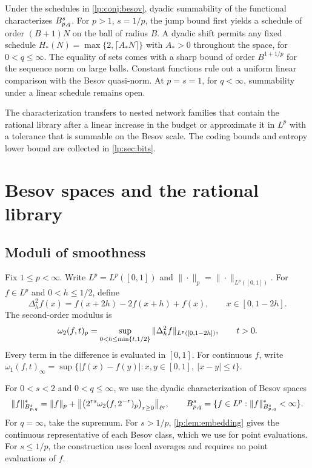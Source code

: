 \documentclass[11pt,a4paper]{article}
\begin{document}
Under the schedules in \cref{lp:conj:besov}, dyadic summability of the functional characterizes $B^{s}_{p,q}$. For $p>1$, $s=1/p$, the jump bound first yields a schedule of order $(B+1)N$ on the ball of radius $B$. A dyadic shift permits any fixed schedule $H_*(N)=\max\{2,\lceil A_*N\rceil\}$ with $A_*>0$ throughout the space, for $0<q\le\infty$. The equality of sets comes with a sharp bound of order $B^{1+1/p}$ for the sequence norm on large balls. Constant functions rule out a uniform linear comparison with the Besov quasi-norm. At $p=s=1$, for $q<\infty$, summability under a linear schedule remains open.

The characterization transfers to nested network families that contain the rational library after a linear increase in the budget or approximate it in $L^p$ with a tolerance that is summable on the Besov scale. The coding bounds and entropy lower bound are collected in \cref{lp:sec:bits}.

\section{Besov spaces and the rational library}
\label{lp:sec:defs}

\subsection{Moduli of smoothness}

Fix $1\le p<\infty$. Write $L^p=L^p([0,1])$ and $\|\cdot\|_p=\|\cdot\|_{L^p([0,1])}$. For $f\in L^p$ and $0<h\le1/2$, define
\begin{equation}
 \Delta_h^2f(x)=f(x+2h)-2f(x+h)+f(x),\qquad x\in[0,1-2h].
 \label{lp:eq:second-difference}
\end{equation}
The second-order modulus is
\begin{equation}
 \omega_2(f,t)_{p}
 =\sup_{0<h\le\min\{t,1/2\}}\|\Delta_h^2f\|_{L^p([0,1-2h])},
 \qquad t>0.
 \label{lp:eq:modulus-p}
\end{equation}
Every term in the difference is evaluated in $[0,1]$. For continuous $f$, write
$\omega_1(f,t)_\infty=\sup\{|f(x)-f(y)|:x,y\in[0,1],\ |x-y|\le t\}$.

For $0<s<2$ and $0<q\le\infty$, we use the dyadic characterization of Besov spaces
\citep{artigo_2-devorelorentz1993,lp-ditzian1987}
\begin{equation}
 \|f\|^*_{B^{s}_{p,q}}
 =\|f\|_p+\big\|\big(2^{rs}\omega_2(f,2^{-r})_{p}\big)_{r\ge0}\big\|_{\ell^q},
 \qquad
 B^{s}_{p,q}=\{f\in L^p:\|f\|^*_{B^{s}_{p,q}}<\infty\}.
 \label{lp:eq:besov-p}
\end{equation}
For $q=\infty$, take the supremum. For $s>1/p$, \cref{lp:lem:embedding} gives the continuous representative of each Besov class, which we use for point evaluations. For $s\le1/p$, the construction uses local averages and requires no point evaluations of $f$.
\end{document}
